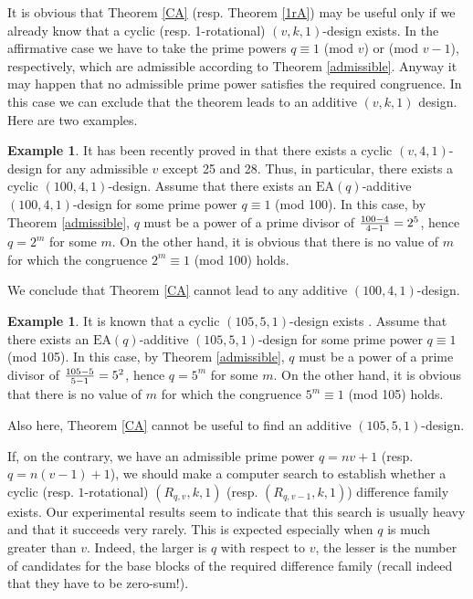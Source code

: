 \documentclass[a4paper, 11pt]{article}
\theoremstyle{definition}
\theoremstyle{definition}
\theoremstyle{definition}
\newtheorem{example}[theorem]{Example}
\numberwithin{equation}{section}
\begin{document}
It is obvious that Theorem \ref{CA} (resp. Theorem \ref{1rA}) may be useful only
if we already know that a cyclic (resp. 1-rotational) $(v,k,1)$-design exists.
In the affirmative case we have to take the prime powers $q\equiv1$ (mod $v$) or (mod $v-1$),
respectively, which are admissible according to Theorem \ref{admissible}. 
Anyway it may happen that no admissible prime power satisfies the required congruence.
In this case we can exclude that the theorem leads to an additive $(v,k,1)$ design.
Here are two examples.
\begin{example}
It has been recently proved in \cite{Zhang} that there
exists a cyclic $(v,4,1)$-design for any admissible $v$ except 25 and 28. Thus, in particular,
there exists a cyclic $(100,4,1)$-design. 
Assume that there exists an $\mathrm{EA}(q)$-additive $(100,4,1)$-design for some prime power $q\equiv 1$ (mod 100). 
In this case, by Theorem \ref{admissible}, $q$ must be a power of a prime divisor of ${100-4\over4-1}=2^5$, hence $q=2^m$
for some $m$. On the other hand, it is obvious that there is no value of $m$ for which the congruence 
$2^m\equiv1$ (mod 100) holds.

We conclude that Theorem \ref{CA} cannot lead to any additive $(100,4,1)$-design. 
\end{example}

\begin{example}
It is known that a cyclic $(105,5,1)$-design exists \cite{AB}.
Assume that there exists an $\mathrm{EA}(q)$-additive $(105,5,1)$-design for some prime power $q\equiv 1$ (mod 105). 
In this case, by Theorem \ref{admissible}, $q$ must be a power of a prime divisor of ${105-5\over5-1}=5^2$, hence $q=5^m$
for some $m$. On the other hand, it is obvious that there is no value of $m$ for which the congruence 
$5^m\equiv1$ (mod 105) holds.

Also here, Theorem \ref{CA} cannot be useful to find an additive $(105,5,1)$-design. 
\end{example}

If, on the contrary, we have an admissible prime power $q=nv+1$ (resp. $q=n(v-1)+1$), 
we should make a computer search to establish whether a cyclic (resp. $1$-rotational) 
$(R_{q,v},k,1)$ (resp. $(R_{q,v-1},k,1)$) difference family exists.
Our experimental results seem to indicate that this search is usually heavy and that it
succeeds very rarely. This is expected especially when $q$ is much greater than $v$. Indeed, the larger is $q$ 
with respect to $v$, the lesser is the number 
of candidates for the base blocks of the required difference family (recall indeed that they have to be zero-sum!). 
\end{document}
